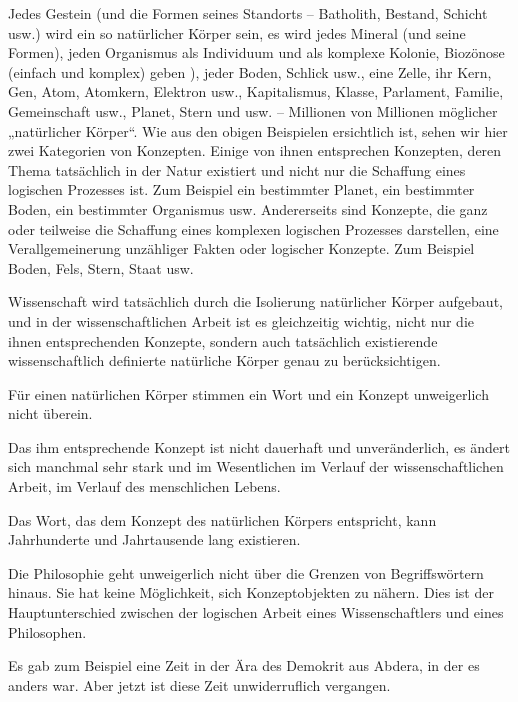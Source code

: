 \documentclass[11pt,a4paper]{book}
\begin{document}
Jedes Gestein (und die Formen seines Standorts -- Batholith, Bestand, Schicht usw.) wird ein so natürlicher Körper sein, es wird jedes Mineral (und seine Formen), jeden Organismus als Individuum und als komplexe Kolonie, Biozönose (einfach und komplex) geben ), jeder Boden, Schlick usw., eine Zelle, ihr Kern, Gen, Atom, Atomkern, Elektron usw., Kapitalismus, Klasse, Parlament, Familie, Gemeinschaft usw., Planet, Stern und usw. -- Millionen von Millionen möglicher „natürlicher Körper“. Wie aus den obigen Beispielen ersichtlich ist, sehen wir hier zwei Kategorien von Konzepten. Einige von ihnen entsprechen Konzepten, deren Thema tatsächlich in der Natur existiert und nicht nur die Schaffung eines logischen Prozesses ist. Zum Beispiel ein bestimmter Planet, ein bestimmter Boden, ein bestimmter Organismus usw. Andererseits sind Konzepte, die ganz oder teilweise die Schaffung eines komplexen logischen Prozesses darstellen, eine Verallgemeinerung unzähliger Fakten oder logischer Konzepte. Zum Beispiel Boden, Fels, Stern, Staat usw.



Wissenschaft wird tatsächlich durch die Isolierung natürlicher Körper aufgebaut, und in der wissenschaftlichen Arbeit ist es gleichzeitig wichtig, nicht nur die ihnen entsprechenden Konzepte, sondern auch tatsächlich existierende wissenschaftlich definierte natürliche Körper genau zu berücksichtigen.



Für einen natürlichen Körper stimmen ein Wort und ein Konzept unweigerlich nicht überein.



Das ihm entsprechende Konzept ist nicht dauerhaft und unveränderlich, es ändert sich manchmal sehr stark und im Wesentlichen im Verlauf der wissenschaftlichen Arbeit, im Verlauf des menschlichen Lebens.



Das Wort, das dem Konzept des natürlichen Körpers entspricht, kann Jahrhunderte und Jahrtausende lang existieren.



Die Philosophie geht unweigerlich nicht über die Grenzen von Begriffswörtern hinaus. Sie hat keine Möglichkeit, sich Konzeptobjekten zu nähern. Dies ist der Hauptunterschied zwischen der logischen Arbeit eines Wissenschaftlers und eines Philosophen.



Es gab zum Beispiel eine Zeit in der Ära des Demokrit aus Abdera, in der es anders war. Aber jetzt ist diese Zeit unwiderruflich vergangen.
\end{document}
